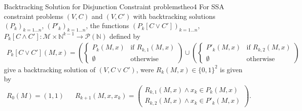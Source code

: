 \begin{theorem}{Backtracking Solution for Disjunction Constraint problems}{theo4}
    For SSA constraint problems $(V,C)$ and $(V,C')$ with backtracking
    solutions $(P_k)_{k=1\dots n}$, $(P'_k)_{k=1\dots n}$, the
    functions $(P_k[C\mathrel\lor C'])_{k=1\dots n}$,
    $P_k[C\mathrel\land C']\colon\mathcal M\times\mathbb N^{k-1}\rightarrow\mathcal P(\mathbb N)$
    defined by
    \begin{align*}
        P_k[C\mathrel\lor C'](M,x)=\left(\left\{
            \begin{array}{ll}
                P_k(M,x)&\text{if }R_{k,1}(M,x)\\
                \emptyset&\text{otherwise}
            \end{array}\right.
            \right)\cup\left(\left\{
            \begin{array}{ll}
                P'_k(M,x)&\text{if }R_{k,2}(M,x)\\
                \emptyset&\text{otherwise}
            \end{array}\right.
            \right)
    \end{align*}
    give a backtracking solution of $(V,C\mathrel\lor C')$, were
    $R_k(M,x)\in\{0,1\}^2$ is given by 
    \begin{align*}
        R_0(M)=(1,1)&&
        R_{k+1}(M,x,x_k)=\left(
            \begin{array}{l}
                R_{k,1}(M,x)\mathrel\land x_k\in P_k(M,x)\\
                R_{k,2}(M,x)\mathrel\land x_k\in P'_k(M,x)
            \end{array}\right).
    \end{align*}
    \tcblower

\end{theorem}
